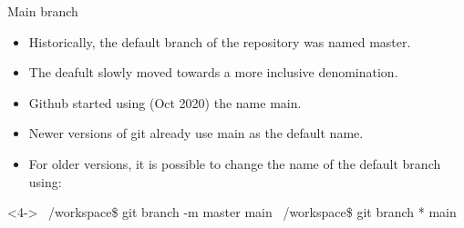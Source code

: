 \begin{frame}[fragile]{Main branch}
  \begin{itemize}[<+->]
      \item Historically, the default branch of the repository was named \alert{master}.
      \item The deafult slowly moved towards a more inclusive denomination.
      \item Github started using (Oct 2020) the name \alert{main}.
      \item Newer versions of git already use \alert{main} as the default name.
      \item For older versions, it is possible to change the name of the default branch using:
  \end{itemize}
  \begin{shellblock}<4->
~/workspace\$ git branch -m master main\inserthitenter
~/workspace\$ git branch\inserthitenter
{\color{white}*} main
\end{shellblock}
\end{frame}